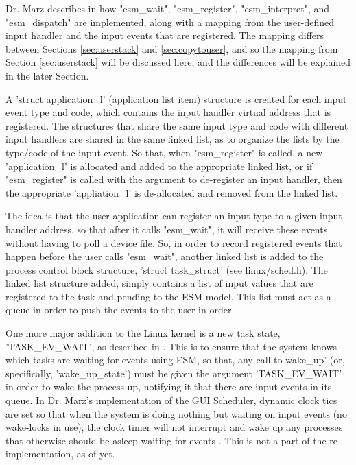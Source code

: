 \documentclass[10pt,journal,compsoc]{IEEEtran}
\begin{document}
Dr. Marz describes in \cite{Marz_BVZ_ESM} how "esm\_wait", "esm\_register", "esm\_interpret", and "esm\_dispatch" are implemented, along with a mapping from the user-defined input handler and the input events that are registered. The mapping differs between Sections \ref{sec:userstack} and \ref{sec:copytouser}, and so the mapping from Section \ref{sec:userstack} will be discussed here, and the differences will be explained in the later Section.

A 'struct application\_l' (application list item) structure is created for each input event type and code, which contains the input handler virtual address that is registered. The structures that share the same input type and code with different input handlers are shared in the same linked list, as to organize the lists by the type/code of the input event. So that, when "esm\_register" is called, a new 'application\_l' is allocated and added to the appropriate linked list, or if "esm\_register" is called with the argument to de-register an input handler, then the appropriate 'appliation\_l' is de-allocated and removed from the linked list.

The idea is that the user application can register an input type to a given input handler address, so that after it calls "esm\_wait", it will receive these events without having to poll a device file. So, in order to record registered events that happen before the user calls "esm\_wait", another linked list is added to the process control block structure, 'struct task\_struct' (see linux/sched.h). The linked list structure added, simply contains a list of input values that are registered to the task and pending to the ESM model. This list must act as a queue in order to push the events to the user in order.

One more major addition to the Linux kernel is a new task state, 'TASK\_EV\_WAIT', as described in \cite{Marz_BVZ_ESM}. This is to ensure that the system knows which tasks are waiting for events using ESM, so that, any call to wake\_up' (or, specifically, 'wake\_up\_state') must be given the argument 'TASK\_EV\_WAIT' in order to wake the process up, notifying it that there are input events in its queue. In Dr. Marz's implementation of the GUI Scheduler, dynamic clock tics are set so that when the system is doing nothing but waiting on input events (no wake-locks in use), the clock timer will not interrupt and wake up any processes that otherwise should be asleep waiting for events \cite{Marz2018ReducingPC}. This is not a part of the re-implementation, as of yet.
\end{document}
